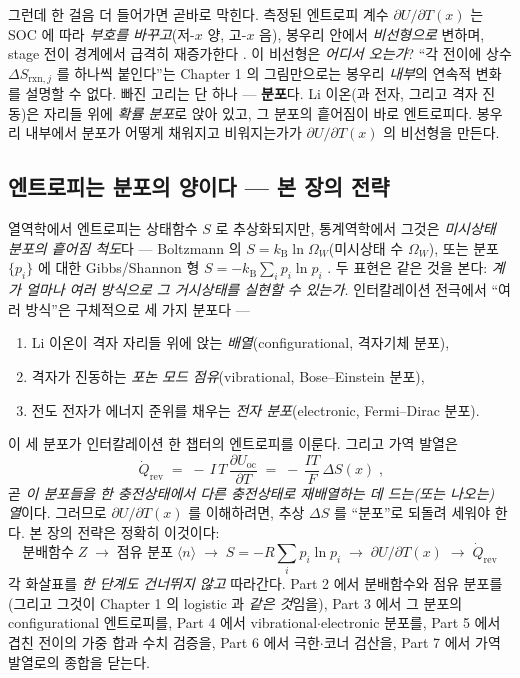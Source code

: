 \documentclass[11pt,a4paper]{article}
\newcommand{\rxn}{\mathrm{rxn}}
\newcommand{\rev}{\mathrm{rev}}
\newcommand{\oc}{\mathrm{oc}}
\newcommand{\kB}{k_{\mathrm B}}
\newcommand{\avg}[1]{\langle #1\rangle}
\begin{document}
그런데 한 걸음 더 들어가면 곧바로 막힌다. 측정된 엔트로피 계수 $\partial U/\partial T(x)$ 는 SOC 에 따라
\emph{부호를 바꾸고}(저-$x$ 양, 고-$x$ 음), 봉우리 안에서 \emph{비선형으로} 변하며, stage 전이 경계에서
급격히 재증가한다 \cite{reynier2003,allart2018}. 이 비선형은 \emph{어디서 오는가}? ``각 전이에 상수
$\Delta S_{\rxn,j}$ 를 하나씩 붙인다''는 Chapter 1 의 그림만으로는 봉우리 \emph{내부}의 연속적 변화를
설명할 수 없다. 빠진 고리는 단 하나 — \textbf{분포}다. Li 이온(과 전자, 그리고 격자 진동)은 자리들 위에
\emph{확률 분포}로 앉아 있고, 그 분포의 흩어짐이 바로 엔트로피다. 봉우리 내부에서 분포가 어떻게 채워지고
비워지는가가 $\partial U/\partial T(x)$ 의 비선형을 만든다.

\subsection{엔트로피는 분포의 양이다 — 본 장의 전략}\label{sec:strategy}
열역학에서 엔트로피는 상태함수 $S$ 로 추상화되지만, 통계역학에서 그것은 \emph{미시상태 분포의 흩어짐
척도}다 — Boltzmann 의 $S=\kB\ln\Omega_W$(미시상태 수 $\Omega_W$), 또는 분포 $\{p_i\}$ 에 대한
Gibbs/Shannon 형 $S=-\kB\sum_i p_i\ln p_i$ \cite{newman,pathria}. 두 표현은 같은 것을 본다: \emph{계가
얼마나 여러 방식으로 그 거시상태를 실현할 수 있는가.} 인터칼레이션 전극에서 ``여러 방식''은 구체적으로
세 가지 분포다 —
\begin{enumerate}[leftmargin=1.8em,itemsep=2pt,label=(\roman*)]
\item Li 이온이 격자 자리들 위에 앉는 \emph{배열}(configurational, 격자기체 분포),
\item 격자가 진동하는 \emph{포논 모드 점유}(vibrational, Bose--Einstein 분포),
\item 전도 전자가 에너지 준위를 채우는 \emph{전자 분포}(electronic, Fermi--Dirac 분포).
\end{enumerate}
이 세 분포가 인터칼레이션 한 챕터의 엔트로피를 이룬다. 그리고 가역 발열은
\begin{equation}
\boxed{\;\dot Q_\rev \;=\; -\,I\,T\,\frac{\partial U_\oc}{\partial T}\;=\;-\,\frac{IT}{F}\,\Delta S(x)\;,}
\label{eq:qrev_intro}
\end{equation}
곧 \emph{이 분포들을 한 충전상태에서 다른 충전상태로 재배열하는 데 드는(또는 나오는) 열}이다. 그러므로
$\partial U/\partial T(x)$ 를 이해하려면, 추상 $\Delta S$ 를 ``분포''로 되돌려 세워야 한다. 본 장의 전략은
정확히 이것이다:
\[
\boxed{\;\text{분배함수}\;Z\;\to\;\text{점유 분포}\;\avg n\;\to\;S=-R\textstyle\sum_i p_i\ln p_i\;\to\;\partial U/\partial T(x)\;\to\;\dot Q_\rev\;}
\]
각 화살표를 \emph{한 단계도 건너뛰지 않고} 따라간다. Part 2 에서 분배함수와 점유 분포를(그리고 그것이
Chapter 1 의 logistic 과 \emph{같은 것}임을), Part 3 에서 그 분포의 configurational 엔트로피를,
Part 4 에서 vibrational$\cdot$electronic 분포를, Part 5 에서 겹친 전이의 가중 합과 수치 검증을, Part 6 에서
극한$\cdot$코너 검산을, Part 7 에서 가역 발열로의 종합을 닫는다.
\end{document}
